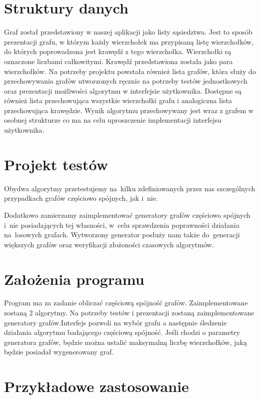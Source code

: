 \documentclass[a4paper,12pt]{mwart}
\begin{document}
\section{Struktury danych}

Graf został przedstawiony w naszej aplikacji jako listy sąsiedztwa. Jest to sposób
prezentacji grafu, w którym każdy wierzchołek ma przypisaną listę wierzchołków, do
których poprowadzona jest krawędź z tego wierzchołka. Wierzchołki
są oznaczone liczbami całkowitymi. Krawędź przedstawiona została jako para
wierzchołków. Na potrzeby projektu powstała również lista grafów, która służy do
przechowywania grafów utworzonych ręcznie na potrzeby testów jednostkowych oraz
prezentacji możliwości algorytmu w interfejsie użytkownika. Dostępne są również
lista przechowująca wszystkie wierzchołki grafu i analogiczna lista
przechowująca krawędzie. Wynik algorytmu przechowywany jest wraz z grafem w
osobnej strukturze co ma na celu uproszczenie implementacji interfejsu
użytkownika.

\section{Projekt testów}

Obydwa algorytmy przetestujemy na~kilku zdefiniowanych przez nas szczególnych
przypadkach grafów częściowo spójnych, jak i~nie.

Dodatkowo zamierzamy zaimplementować generatory grafów częściowo spójnych i~nie
posiadających tej własności, w~celu sprawdzenia poprawności działania
na~losowych grafach. Wytworzony generator posłuży nam także do~generacji
większych grafów oraz weryfikacji złożoności czasowych algorytmów.

\section{Założenia programu}

Program ma za zadanie obliczać częściową spójność grafów. Zaimplementowane
zostaną 2 algorytmy. Na potrzeby testów i
prezentacji zostaną zaimplementowane generatory grafów.Interfejs pozwoli na
wybór grafu a
następnie śledzenie działania algorytmu badającego częściową spójność.
Jeśli chodzi o parametry generatora grafów, będzie można ustalić maksymalną liczbę
wierzchołków, jaką będzie posiadał wygenerowany graf.

\section{Przykładowe zastosowanie}
\end{document}
